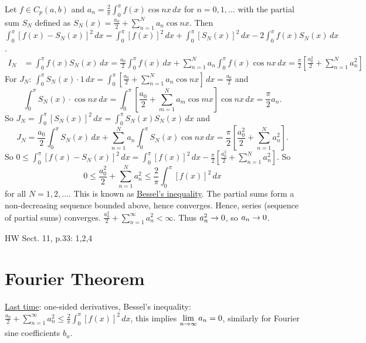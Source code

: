 \documentclass[]{article}
\begin{document}
Let $f\in C_p(a,b)$ and $a_n=\frac{2}{\pi} \int_0^\pi f(x) \cos{nx} \, dx$ for $n=0,1,\dots$ with the partial sum $S_N$ defined as $S_N(x) = \frac{a_0}{2} + \sum_{n=1}^N a_n \cos{nx}$. 
Then $\int_0^\pi \left[ f(x) - S_N(x) \right]^2 \, dx = \int_0^\pi \left[ f(x) \right]^2 \, dx + \int_0^\pi \left[ S_N(x) \right]^2 \, dx - 2\int_0^\pi f(x) S_N(x) \, dx$.
\begin{align*}I_N &= \int_0^\pi f(x) S_N(x) \, dx = \frac{a_0}{2} \int_0^\pi f(x) \, dx + \sum_{n=1}^N a_n \int_0^\pi f(x) \cos{nx} \, dx = \frac{\pi}{2} \left[ \frac{a_0^2}{2} + \sum_{n=1}^N a_n^2 \right] \end{align*}
For $J_N$: $\int_0^\pi S_N(x)\cdot1\,dx = \int_0^\pi \left[ \frac{a_0}{2} + \sum_{n=1}^N a_n \cos{nx} \right] \, dx = \frac{a_0}{2}$ 
and $$\int_0^\pi S_N(x) \cdot \cos{nx} \, dx = \int_0^\pi \left[ \frac{a_0}{2} + \sum_{m=1}^N a_m \cos{mx} \right] \cos{nx} \, dx = \frac{\pi}{2} a_n.$$
So $J_N = \int_0^\pi \left[ S_N(x) \right]^2 \, dx = \int_0^\pi S_N(x) S_N(x) \, dx $ and $$J_N = \frac{a_0}{2} \int_0^\pi S_N(x)\, dx + \sum_{n=1}^N a_n \int_0^\pi S_N(x) \cos{nx} \, dx = \frac{\pi}{2} \left[ \frac{a_0^2}{2} + \sum_{n=1}^N a_n^2 \right].$$
So $0\leq \int_0^\pi \left[ f(x) - S_N(x) \right]^2 \, dx = \int_0^\pi [f(x)]^2\, dx - \frac{\pi}{2} \left[ \frac{a_0^2}{2} + \sum_{n=1}^N a_n^2 \right]$.
So \begin{equation}0\leq \frac{a_0^2}{2} + \sum_{n=1}^N a_n^2 \leq \frac{2}{\pi} \int_0^\pi [f(x)]^2 \, dx\end{equation} for all $N=1,2,\dots$. This is known as \underline{Bessel's inequality}. The partial sums form a non-decreasing sequence bounded above, hence converges. Hence, series (sequence of partial sums) converges.
$\frac{a_0^2}{2} + \sum_{n=1}^\infty a_n^2 <\infty$. Thus $a_n^2\rightarrow 0$, so $a_n\rightarrow0$.

HW Sect. 11, p.33: 1,2,4

\section{Fourier Theorem}

\underline{Last time}: one-sided derivatives, Bessel's inequality: $ \displaystyle \frac{a_0}{2} + \sum_{n=1}^\infty a_n^2 \leq \frac{2}{\pi} \int_0^\pi [f(x)]^2 \, dx$, this implies $\displaystyle \lim_{n\rightarrow\infty} a_n =0$, similarly for Fourier sine coefficients $b_n$.
\end{document}
